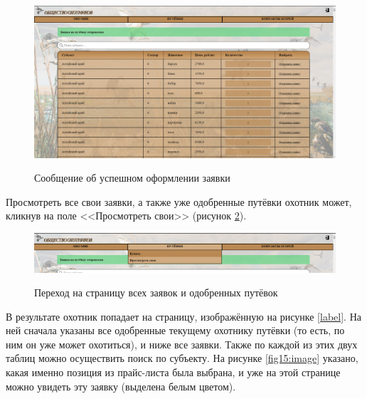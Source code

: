 	\begin{figure}[h]
		\centering
		\begin{center}
			{\includegraphics[scale=0.34]{schemes/screens/msg_right.png}}
			\caption{Сообщение об успешном оформлении заявки}
			\label{fig16:image}
		\end{center}
	\end{figure}

	Просмотреть все свои заявки, а также уже одобренные путёвки охотник может, кликнув на поле <<Просмотреть свои>> (рисунок \ref{fig17:image}).
	
	\begin{figure}[h]
		\centering
		\begin{center}
			{\includegraphics[scale=0.34]{schemes/screens/to_have.png}}
			\caption{Переход на страницу всех заявок и одобренных путёвок}
			\label{fig17:image}
		\end{center}
	\end{figure}

	В результате охотник попадает на страницу, изображённую на рисунке \ref{label}. На ней сначала указаны все одобренные текущему охотнику путёвки (то есть, по ним он уже может охотиться), и ниже все заявки. Также по каждой из этих двух таблиц можно осуществить поиск по субъекту. На рисунке \ref{fig15:image} указано, какая именно позиция из прайс-листа была выбрана, и уже на этой странице можно увидеть эту заявку (выделена белым цветом).
	
